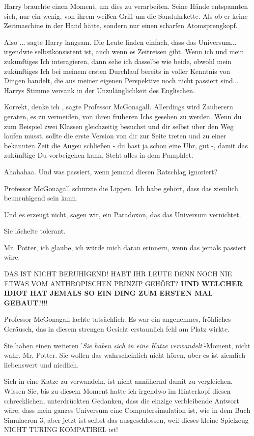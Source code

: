 Harry brauchte einen Moment, um dies zu verarbeiten. Seine Hände entspannten
sich, nur ein wenig, von ihrem weißen Griff um die Sanduhrkette. Als ob er keine
Zeitmaschine in der Hand hätte, sondern nur einen scharfen Atomsprengkopf.

\glqq Also ...\grqq{} sagte Harry langsam. \glqq Die Leute finden einfach, dass
das Universum... irgendwie selbstkonsistent ist, auch wenn es Zeitreisen gibt.
Wenn ich und mein zukünftiges Ich interagieren, dann sehe ich dasselbe wie
beide, obwohl mein zukünftiges Ich bei meinem ersten Durchlauf bereits in voller
Kenntnis von Dingen handelt, die aus meiner eigenen Perspektive noch nicht
passiert sind...\grqq{} Harrys Stimme versank in der Unzulänglichkeit des
Englischen.

\glqq Korrekt, denke ich\grqq{} , sagte Professor McGonagall. \glqq Allerdings
wird Zauberern geraten, es zu vermeiden, von ihren früheren Ichs gesehen zu
werden. Wenn du zum Beispiel zwei Klassen gleichzeitig besuchst und dir selbst
über den Weg laufen musst, sollte die erste Version von dir zur Seite treten und
zu einer bekannten Zeit die Augen schließen - du hast ja schon eine Uhr, gut -,
damit das zukünftige Du vorbeigehen kann. Steht alles in dem Pamphlet.\grqq{}

\glqq Ahahahaa. Und was passiert, wenn jemand diesen Ratschlag ignoriert?\grqq{}

Professor McGonagall schürzte die Lippen. \glqq Ich habe gehört, dass das
ziemlich beunruhigend sein kann.\grqq{}

\glqq Und es erzeugt nicht, sagen wir, ein Paradoxon, das das Universum
vernichtet.\grqq{}

Sie lächelte tolerant.

\glqq Mr. Potter, ich glaube, ich würde mich daran erinnern, wenn das jemals
passiert wäre.\grqq{}

\glqq DAS IST NICHT BERUHIGEND! HABT IHR LEUTE DENN NOCH NIE ETWAS VOM
ANTHROPISCHEN PRINZIP GEHÖRT? \textbf{UND WELCHER IDIOT HAT JEMALS SO EIN DING
ZUM ERSTEN MAL GEBAUT}?!!!\grqq{}

Professor McGonagall lachte tatsächlich. Es war ein angenehmes, fröhliches
Geräusch, das in diesem strengen Gesicht erstaunlich fehl am Platz wirkte.

\glqq Sie haben einen weiteren '\emph{Sie haben sich in eine Katze
verwandelt'}-Moment, nicht wahr, Mr. Potter. Sie wollen das wahrscheinlich nicht
hören, aber es ist ziemlich liebenswert und niedlich.\grqq{}

\glqq Sich in eine Katze zu verwandeln, ist nicht annähernd damit zu
vergleichen. Wissen Sie, bis zu diesem Moment hatte ich irgendwo im Hinterkopf
diesen schrecklichen, unterdrückten Gedanken, dass die einzige verbleibende
Antwort wäre, dass mein ganzes Universum eine Computersimulation ist, wie in dem
Buch Simulacron 3, aber jetzt ist selbst das ausgeschlossen, weil dieses kleine
Spielzeug NICHT TURING KOMPATIBEL ist!

